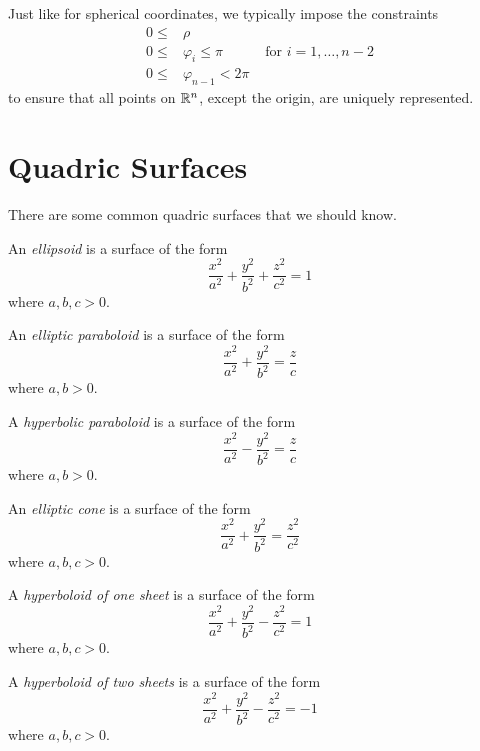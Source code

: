 \documentclass{article}
\begin{document}
Just like for spherical coordinates, we typically impose the constraints
\begin{align*}
  0 \leq  & \rho
  \\
  0  \leq & \varphi_i \leq \pi     & \text{ for $i = 1, \ldots, n - 2$}
  \\
  0  \leq & \varphi_{n - 1} < 2\pi
\end{align*}
to ensure that all points on $\mathbb{R}^n$, except the origin, are uniquely represented.

\section{Quadric Surfaces}

There are some common quadric surfaces that we should know.

\begin{definition}[Ellipsoid]
  An \emph{ellipsoid} is a surface of the form
  \[
    \frac{x^2}{a^2} + \frac{y^2}{b^2} + \frac{z^2}{c^2} = 1
  \]
  where $a, b, c > 0$.
\end{definition}

\begin{definition}
  An \emph{elliptic paraboloid} is a surface of the form
  \[
    \frac{x^2}{a^2} + \frac{y^2}{b^2} = \frac{z}{c}
  \]
  where $a, b > 0$.
\end{definition}

\begin{definition}
  A \emph{hyperbolic paraboloid} is a surface of the form
  \[
    \frac{x^2}{a^2} - \frac{y^2}{b^2} = \frac{z}{c}
  \]
  where $a, b > 0$.
\end{definition}

\begin{definition}
  An \emph{elliptic cone} is a surface of the form
  \[
    \frac{x^2}{a^2} + \frac{y^2}{b^2} = \frac{z^2}{c^2}
  \]
  where $a, b, c > 0$.
\end{definition}

\begin{definition}
  A \emph{hyperboloid of one sheet} is a surface of the form
  \[
    \frac{x^2}{a^2} + \frac{y^2}{b^2} - \frac{z^2}{c^2} = 1
  \]
  where $a, b, c > 0$.
\end{definition}

\begin{definition}
  A \emph{hyperboloid of two sheets} is a surface of the form
  \[
    \frac{x^2}{a^2} + \frac{y^2}{b^2} - \frac{z^2}{c^2} = -1
  \]
  where $a, b, c > 0$.
\end{definition}
\end{document}
